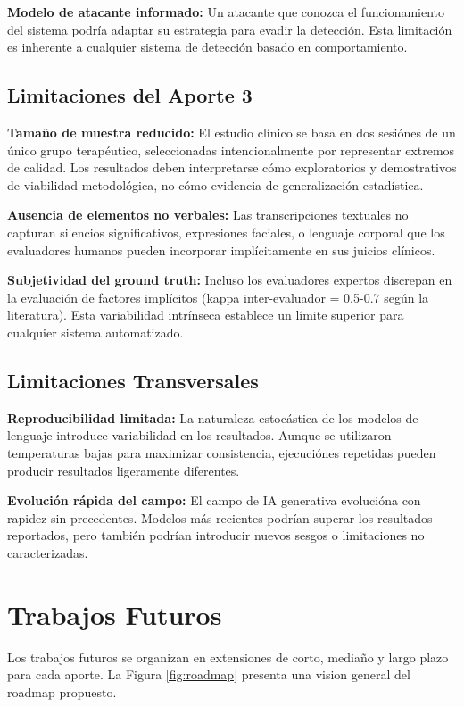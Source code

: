 \documentclass[12pt,a4paper,twoside]{book}
\begin{document}
\textbf{Modelo de atacante informado:} Un atacante que conozca el funcionamiento del sistema podría adaptar su estrategia para evadir la detección. Esta limitación es inherente a cualquier sistema de detección basado en comportamiento.

\subsection{Limitaciones del Aporte 3}

\textbf{Tamaño de muestra reducido:} El estudio clínico se basa en dos sesiónes de un único grupo terapéutico, seleccionadas intencionalmente por representar extremos de calidad. Los resultados deben interpretarse cómo exploratorios y demostrativos de viabilidad metodológica, no cómo evidencia de generalización estadística.

\textbf{Ausencia de elementos no verbales:} Las transcripciones textuales no capturan silencios significativos, expresiones faciales, o lenguaje corporal que los evaluadores humanos pueden incorporar implícitamente en sus juicios clínicos.

\textbf{Subjetividad del ground truth:} Incluso los evaluadores expertos discrepan en la evaluación de factores implícitos (kappa inter-evaluador = 0.5-0.7 según la literatura). Esta variabilidad intrínseca establece un límite superior para cualquier sistema automatizado.

\subsection{Limitaciones Transversales}

\textbf{Reproducibilidad limitada:} La naturaleza estocástica de los modelos de lenguaje introduce variabilidad en los resultados. Aunque se utilizaron temperaturas bajas para maximizar consistencia, ejecuciónes repetidas pueden producir resultados ligeramente diferentes.

\textbf{Evolución rápida del campo:} El campo de IA generativa evolucióna con rapidez sin precedentes. Modelos más recientes podrían superar los resultados reportados, pero también podrían introducir nuevos sesgos o limitaciones no caracterizadas.

\section{Trabajos Futuros}

Los trabajos futuros se organizan en extensiones de corto, mediaño y largo plazo para cada aporte. La Figura \ref{fig:roadmap} presenta una vision general del roadmap propuesto.
\end{document}
